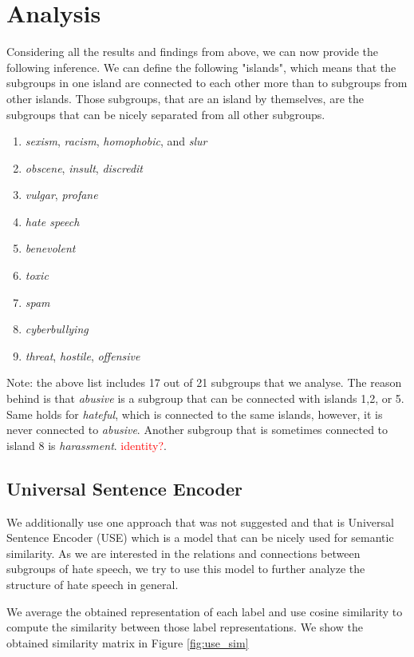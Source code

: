 \documentclass[fleqn,moreauthors,10pt]{ds_report}
\begin{document}
 \section*{Analysis}
Considering all the results and findings from above, we can now provide the following inference. We can define the following "islands", which means that the subgroups in one island are connected to each other more than to subgroups from other islands. Those subgroups, that are an island by themselves, are the subgroups that can be nicely separated from all other subgroups. 
\begin{enumerate}
  \item \textit{sexism}, \textit{racism}, \textit{homophobic}, and \textit{slur} 
  \item \textit{obscene}, \textit{insult}, \textit{discredit}
  \item \textit{vulgar}, \textit{profane}
  \item \textit{hate speech}
  \item \textit{benevolent}
  \item \textit{toxic}
  \item \textit{spam}
  \item \textit{cyberbullying}
  \item \textit{threat}, \textit{hostile}, \textit{offensive}
\end{enumerate}
Note: the above list includes 17 out of 21 subgroups that we analyse. The reason behind is that \textit{abusive} is a subgroup that can be connected with islands 1,2, or 5. Same holds for \textit{hateful}, which is connected to the same islands, however, it is never connected to \textit{abusive}. Another subgroup that is sometimes connected to island 8 is \textit{harassment}. \textcolor{red}{identity?}.


\subsection{Universal Sentence Encoder}
We additionally use one approach that was not suggested and that is Universal Sentence Encoder (USE) which is a model that can be nicely used for semantic similarity. As we are interested in the relations and connections between subgroups of hate speech, we try to use this model to further analyze the structure of hate speech in general.

We average the obtained representation of each label and use cosine similarity to compute the similarity between those label representations. We show the obtained similarity matrix in Figure \ref{fig:use_sim}
\end{document}
